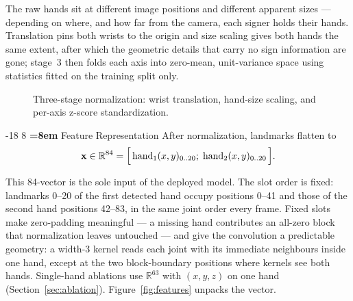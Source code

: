 \documentclass{llncs}
\makeatletter
\renewcommand\subsection{\@startsection{subsection}{2}{\z@}%
                      {-18\p@ \@plus -4\p@ \@minus -4\p@}%
                      {8\p@ \@plus 4\p@ \@minus 4\p@}%
                      {\normalfont\large\bfseries\boldmath
                       \rightskip=\z@ \@plus 8em\pretolerance=10000 }}
\makeatother
\begin{document}
The raw hands sit at different image positions and different apparent
sizes --- depending on where, and how far from the camera, each signer
holds their hands. Translation pins both wrists to the origin and size
scaling gives both hands the same extent, after which the geometric
details that carry no sign information are gone; stage~3 then folds
each axis into zero-mean, unit-variance space using statistics fitted
on the training split only.

\begin{figure}[t]
\centering
{}
\caption{Three-stage normalization: wrist translation, hand-size scaling,
and per-axis z-score standardization.}
\label{fig:norm}
\end{figure}

\subsection{Feature Representation}
\label{sec:feature}
After normalization, landmarks flatten to
\begin{equation}
\large
\mathbf{x} \in \mathbb{R}^{84}
= \big[\,\mathrm{hand}_1(x,y)_{0..20};\;
\mathrm{hand}_2(x,y)_{0..20}\,\big].
\end{equation}

This 84-vector is the sole input of the deployed model. The slot order
is fixed: landmarks 0--20 of the first detected hand occupy positions
0--41 and those of the second hand positions 42--83, in the same joint
order every frame. Fixed slots make zero-padding meaningful --- a
missing hand contributes an all-zero block that normalization leaves
untouched --- and give the convolution a predictable geometry: a width-3
kernel reads each joint with its immediate neighbours inside one hand,
except at the two block-boundary positions where kernels see both hands.
Single-hand ablations use $\mathbb{R}^{63}$ with $(x,y,z)$ on one hand
(Section~\ref{sec:ablation}).
Figure~\ref{fig:features} unpacks the vector.
\end{document}
